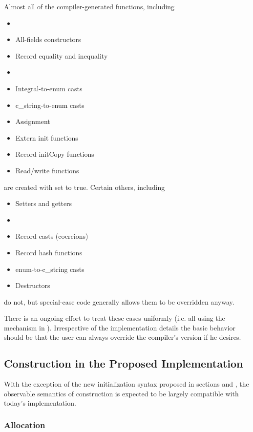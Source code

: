Almost all of the compiler-generated functions, including
\begin{itemize}
\item {}
\item All-fields constructors
\item Record equality and inequality
\item {}
\item Integral-to-enum casts
\item c\_string-to-enum casts
\item Assignment
\item Extern init functions
\item Record initCopy functions
\item Read/write functions
\end{itemize}
are created with  set to true.  Certain others, including
\begin{itemize}
\item Setters and getters
\item {}
\item Record casts (coercions)
\item Record hash functions
\item enum-to-c\_string casts
\item Destructors
\end{itemize}
\noindent
do not, but special-case code generally allows them to be overridden anyway.

There is an ongoing effort to treat these cases uniformly (i.e. all using the
 mechanism in ).  Irrespective of
the implementation details the basic behavior should be that the user can always override
the compiler's version if he desires.

\subsection{Construction in the Proposed Implementation}

With the exception of the new initialization syntax proposed in sections
 and , the observable semantics of construction is
expected to be largely compatible with today's implementation.  

\subsubsection{Allocation}

